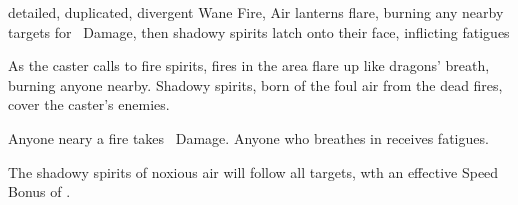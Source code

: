   {detailed, duplicated, divergent}%
  {Wane}%
  {Fire, Air}%
  {}%
  {lanterns flare, burning  any nearby targets for \showDam\ Damage, then shadowy spirits latch onto their face, inflicting  \glspl{fatigue}}%
  {
    As the caster calls to fire spirits, fires in the area flare up like dragons' breath, burning anyone nearby.
    Shadowy spirits, born of the foul air from the dead fires, cover the caster's enemies.

    Anyone neary a fire takes \showDam\ Damage.
    Anyone who breathes in receives  \glspl{fatigue}.

    The shadowy spirits of noxious air will follow all targets, wth an effective Speed Bonus of .
  }

